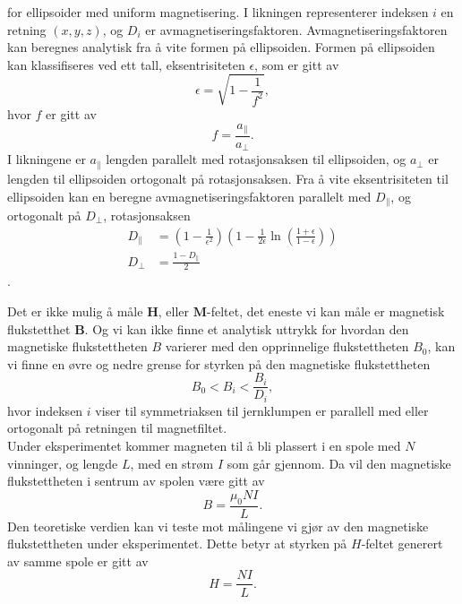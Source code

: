 \documentclass[%
 reprint,
 amsmath,amssymb,
 aps,
 norsk,
]{revtex4-1}
\begin{document}
for ellipsoider med uniform magnetisering. I likningen representerer indeksen $i$ en retning $(x, y, z)$, og $D_i$ er avmagnetiseringsfaktoren. Avmagnetiseringsfaktoren kan beregnes analytisk fra å vite formen på ellipsoiden. Formen på ellipsoiden kan klassifiseres ved ett tall, eksentrisiteten $\epsilon$, som er gitt av
\begin{equation}
  \epsilon = \sqrt{1-\frac{1}{f^2}},\label{eksent}
\end{equation}
hvor $f$ er gitt av
\begin{equation}
  f = \frac{a_{\parallel}}{a_{\perp}}.
\end{equation}
I likningene er $a_{\parallel}$ lengden parallelt med rotasjonsaksen til ellipsoiden, og $a_{\perp}$ er lengden til ellipsoiden ortogonalt på rotasjonsaksen. Fra å vite eksentrisiteten til ellipsoiden kan en beregne avmagnetiseringsfaktoren parallelt med $D_{\parallel}$, og ortogonalt på $D_{\perp}$, rotasjonsaksen
\begin{align}
  D_{\parallel} &= \left(1-\frac{1}{\epsilon^2}\right)\left(1-\frac{1}{2\epsilon}\ln{\left(\frac{1+\epsilon}{1-\epsilon}\right)} \right) \\
  D_{\perp} &= \frac{1-D_{\parallel}}{2}
\end{align}.
\par
Det er ikke mulig å måle $\bm{H}$, eller $\bm{M}$-feltet, det eneste vi kan måle er magnetisk flukstetthet $\bm{B}$. Og vi kan ikke finne et analytisk uttrykk for hvordan den magnetiske flukstettheten $B$ varierer med den opprinnelige flukstettheten $B_0$, kan vi finne en øvre og nedre grense for styrken på den magnetiske flukstettheten
\begin{equation}
  B_0 < B_i < \frac{B_i}{D_i}, \label{upper_limit}
\end{equation}
hvor indeksen $i$ viser til symmetriaksen til jernklumpen er parallell med eller ortogonalt på retningen til magnetfiltet.
\\Under eksperimentet kommer magneten til å bli plassert i en spole med $N$ vinninger, og lengde $L$, med en strøm $I$ som går gjennom. Da vil den magnetiske flukstettheten i sentrum av spolen være gitt av
\begin{equation}
  B = \frac{\mu_0NI}{L}. \label{nice_b}
\end{equation}Den teoretiske verdien kan vi teste mot målingene vi gjør av den magnetiske flukstettheten under eksperimentet. Dette betyr at styrken på $H$-feltet generert av samme spole er gitt av
\begin{equation}
  H = \frac{NI}{L}. \label{nice_H}
\end{equation}
\end{document}
